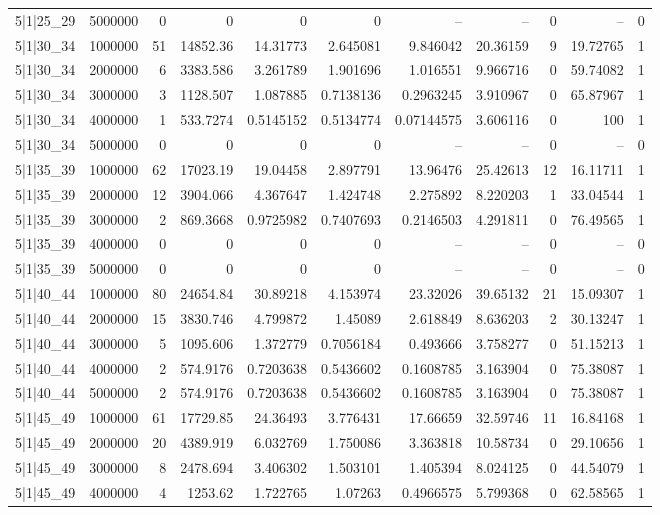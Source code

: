 \begin{tabular}{lrrrrrrrrrr}
5|1|25\_29 & 5000000 & 0 & 0 & 0 & 0 & -- & -- & 0 & -- & 0 \\
5|1|30\_34 & 1000000 & 51 & 14852.36 & 14.31773 & 2.645081 & 9.846042 & 20.36159 & 9 & 19.72765 & 1 \\
5|1|30\_34 & 2000000 & 6 & 3383.586 & 3.261789 & 1.901696 & 1.016551 & 9.966716 & 0 & 59.74082 & 1 \\
5|1|30\_34 & 3000000 & 3 & 1128.507 & 1.087885 & 0.7138136 & 0.2963245 & 3.910967 & 0 & 65.87967 & 1 \\
5|1|30\_34 & 4000000 & 1 & 533.7274 & 0.5145152 & 0.5134774 & 0.07144575 & 3.606116 & 0 & 100 & 1 \\
5|1|30\_34 & 5000000 & 0 & 0 & 0 & 0 & -- & -- & 0 & -- & 0 \\
5|1|35\_39 & 1000000 & 62 & 17023.19 & 19.04458 & 2.897791 & 13.96476 & 25.42613 & 12 & 16.11711 & 1 \\
5|1|35\_39 & 2000000 & 12 & 3904.066 & 4.367647 & 1.424748 & 2.275892 & 8.220203 & 1 & 33.04544 & 1 \\
5|1|35\_39 & 3000000 & 2 & 869.3668 & 0.9725982 & 0.7407693 & 0.2146503 & 4.291811 & 0 & 76.49565 & 1 \\
5|1|35\_39 & 4000000 & 0 & 0 & 0 & 0 & -- & -- & 0 & -- & 0 \\
5|1|35\_39 & 5000000 & 0 & 0 & 0 & 0 & -- & -- & 0 & -- & 0 \\
5|1|40\_44 & 1000000 & 80 & 24654.84 & 30.89218 & 4.153974 & 23.32026 & 39.65132 & 21 & 15.09307 & 1 \\
5|1|40\_44 & 2000000 & 15 & 3830.746 & 4.799872 & 1.45089 & 2.618849 & 8.636203 & 2 & 30.13247 & 1 \\
5|1|40\_44 & 3000000 & 5 & 1095.606 & 1.372779 & 0.7056184 & 0.493666 & 3.758277 & 0 & 51.15213 & 1 \\
5|1|40\_44 & 4000000 & 2 & 574.9176 & 0.7203638 & 0.5436602 & 0.1608785 & 3.163904 & 0 & 75.38087 & 1 \\
5|1|40\_44 & 5000000 & 2 & 574.9176 & 0.7203638 & 0.5436602 & 0.1608785 & 3.163904 & 0 & 75.38087 & 1 \\
5|1|45\_49 & 1000000 & 61 & 17729.85 & 24.36493 & 3.776431 & 17.66659 & 32.59746 & 11 & 16.84168 & 1 \\
5|1|45\_49 & 2000000 & 20 & 4389.919 & 6.032769 & 1.750086 & 3.363818 & 10.58734 & 0 & 29.10656 & 1 \\
5|1|45\_49 & 3000000 & 8 & 2478.694 & 3.406302 & 1.503101 & 1.405394 & 8.024125 & 0 & 44.54079 & 1 \\
5|1|45\_49 & 4000000 & 4 & 1253.62 & 1.722765 & 1.07263 & 0.4966575 & 5.799368 & 0 & 62.58565 & 1 \\

\end{tabular}
